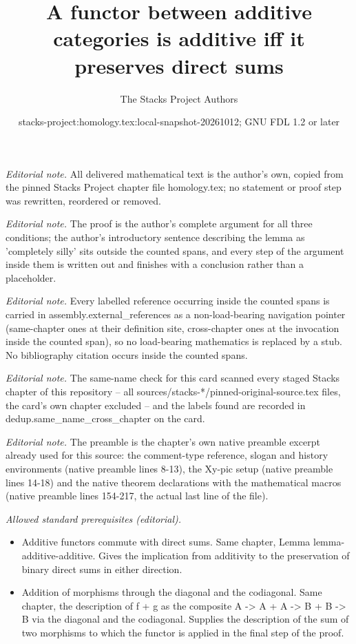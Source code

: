 \documentclass[10pt,a4paper]{amsart}
\title{A functor between additive categories is additive iff it preserves direct sums}
\author{The Stacks Project Authors}
\date{stacks-project:homology.tex:local-snapshot-20261012; GNU FDL 1.2 or later}
\theoremstyle{plain}
\theoremstyle{definition}
\theoremstyle{remark}
\numberwithin{equation}{subsection}
\begin{document}
\maketitle
\noindent\textit{Editorial note.} All delivered mathematical text is the author's own, copied from the pinned Stacks Project chapter file homology.tex; no statement or proof step was rewritten, reordered or removed.\par\medskip
\noindent\textit{Editorial note.} The proof is the author's complete argument for all three conditions; the author's introductory sentence describing the lemma as 'completely silly' sits outside the counted spans, and every step of the argument inside them is written out and finishes with a conclusion rather than a placeholder.\par\medskip
\noindent\textit{Editorial note.} Every labelled reference occurring inside the counted spans is carried in assembly.external\_references as a non-load-bearing navigation pointer (same-chapter ones at their definition site, cross-chapter ones at the invocation inside the counted span), so no load-bearing mathematics is replaced by a stub. No bibliography citation occurs inside the counted spans.\par\medskip
\noindent\textit{Editorial note.} The same-name check for this card scanned every staged Stacks chapter of this repository -- all sources/stacks-*/pinned-original-source.tex files, the card's own chapter excluded -- and the labels found are recorded in dedup.same\_name\_cross\_chapter on the card.\par\medskip
\noindent\textit{Editorial note.} The preamble is the chapter's own native preamble excerpt already used for this source: the comment-type reference, slogan and history environments (native preamble lines 8-13), the Xy-pic setup (native preamble lines 14-18) and the native theorem declarations with the mathematical macros (native preamble lines 154-217, the actual last line of the file).\par\medskip
\noindent\textit{Allowed standard prerequisites (editorial).}\begin{itemize}
\item Additive functors commute with direct sums. Same chapter, Lemma lemma-additive-additive. Gives the implication from additivity to the preservation of binary direct sums in either direction.
\item Addition of morphisms through the diagonal and the codiagonal. Same chapter, the description of f + g as the composite A -> A + A -> B + B -> B via the diagonal and the codiagonal. Supplies the description of the sum of two morphisms to which the functor is applied in the final step of the proof.
\end{itemize}\medskip
\end{document}
